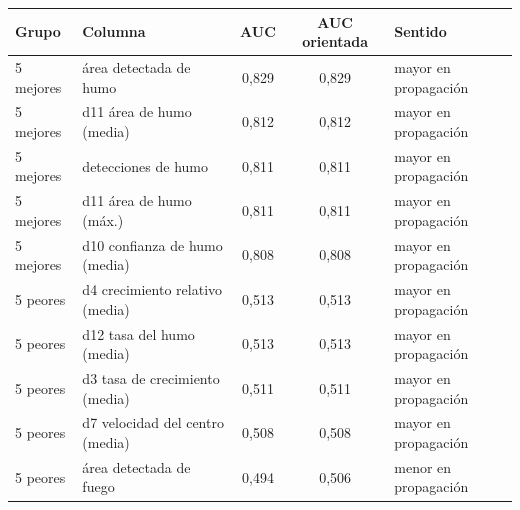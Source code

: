 \begin{tabular}{|l|l|c|c|l|}
\hline
\textbf{Grupo} & \textbf{Columna} & \textbf{AUC} & \textbf{AUC orientada} & \textbf{Sentido} \\ \hline
5 mejores & área detectada de humo & 0{,}829 & 0{,}829 & mayor en propagación \\ \hline
5 mejores & d11 área de humo (media) & 0{,}812 & 0{,}812 & mayor en propagación \\ \hline
5 mejores & detecciones de humo & 0{,}811 & 0{,}811 & mayor en propagación \\ \hline
5 mejores & d11 área de humo (máx.) & 0{,}811 & 0{,}811 & mayor en propagación \\ \hline
5 mejores & d10 confianza de humo (media) & 0{,}808 & 0{,}808 & mayor en propagación \\ \hline
5 peores & d4 crecimiento relativo (media) & 0{,}513 & 0{,}513 & mayor en propagación \\ \hline
5 peores & d12 tasa del humo (media) & 0{,}513 & 0{,}513 & mayor en propagación \\ \hline
5 peores & d3 tasa de crecimiento (media) & 0{,}511 & 0{,}511 & mayor en propagación \\ \hline
5 peores & d7 velocidad del centro (media) & 0{,}508 & 0{,}508 & mayor en propagación \\ \hline
5 peores & área detectada de fuego & 0{,}494 & 0{,}506 & menor en propagación \\ \hline
\end{tabular}
